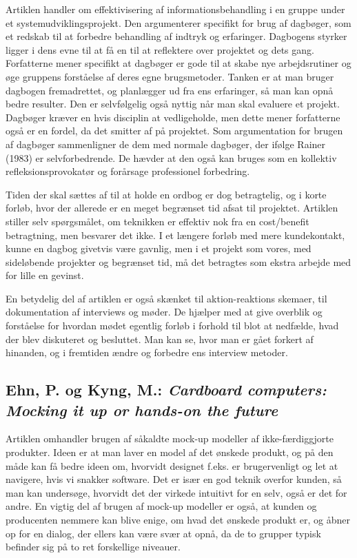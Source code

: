 \documentclass[10pt,a4paper,danish]{article}
\begin{document}
Artiklen handler om effektivisering af informationsbehandling i en gruppe under et systemudviklingsprojekt. Den argumenterer specifikt for brug af dagbøger, som et redskab til at forbedre behandling af indtryk og erfaringer. Dagbogens styrker ligger i dens evne til at få en til at reflektere over projektet og dets gang. Forfatterne mener specifikt at dagbøger er gode til at skabe nye arbejdsrutiner og øge gruppens forståelse af deres egne brugsmetoder. Tanken er at man bruger dagbogen fremadrettet, og planlægger ud fra ens erfaringer, så man kan opnå bedre resulter. Den er selvfølgelig også nyttig når man skal evaluere et projekt. Dagbøger kræver en hvis disciplin at vedligeholde, men dette mener forfatterne også er en fordel, da det smitter af på projektet. Som argumentation for brugen af dagbøger sammenligner de dem med normale dagbøger, der ifølge Rainer (1983) er selvforbedrende. De hævder at den også kan bruges som en kollektiv refleksionsprovokatør og forårsage professionel forbedring. 

Tiden der skal sættes af til at holde en ordbog er dog betragtelig, og i korte forløb, hvor der allerede er en meget begrænset tid afsat til projektet. Artiklen stiller selv spørgsmålet, om teknikken er effektiv nok fra en cost/benefit betragtning, men besvarer det ikke. I et længere forløb med mere kundekontakt, kunne en dagbog givetvis være gavnlig, men i et projekt som vores, med sideløbende projekter og begrænset tid, må det betragtes som ekstra arbejde med for lille en gevinst.

En betydelig del af artiklen er også skænket til aktion-reaktions skemaer, til dokumentation af interviews og møder. De hjælper med at give overblik og forståelse for hvordan mødet egentlig forløb i forhold til blot at nedfælde, hvad der blev diskuteret og besluttet. Man kan se, hvor man er gået forkert af hinanden, og i fremtiden ændre og forbedre ens interview metoder. 

\subsection{Ehn, P. og Kyng, M.: \emph{Cardboard computers: Mocking it up or hands-on the future}}

Artiklen omhandler brugen af såkaldte mock-up modeller af ikke-færdiggjorte produkter. Ideen er at man laver en model af det ønskede produkt, og på den måde kan få bedre ideen om, hvorvidt designet f.eks. er brugervenligt og let at navigere, hvis vi snakker software. Det er især en god teknik overfor kunden, så man kan undersøge, hvorvidt det der virkede intuitivt for en selv, også er det for andre. En vigtig del af brugen af mock-up modeller er også, at kunden og producenten nemmere kan blive enige, om hvad det ønskede produkt er, og åbner op for en dialog, der ellers kan være svær at opnå, da de to grupper typisk befinder sig på to ret forskellige niveauer. 
\end{document}
